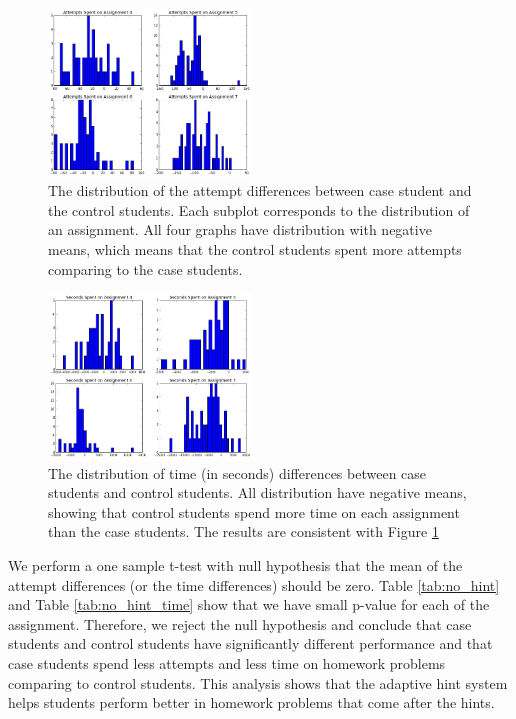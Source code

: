 \documentclass{sigchi}
\begin{document}
\begin{figure}[ht]
\includegraphics[width=0.48\textwidth]{image/assignment_tries_downstream.png}
\caption{The distribution of the attempt differences between case student and the control students. Each subplot corresponds to the distribution of an assignment. All four graphs have distribution with negative means, which means that the control students spent more attempts comparing to the case students.}
    \label{fig:downstream_tries_analysis}
\end{figure}

\begin{figure}[ht]
\includegraphics[width=0.48\textwidth]{image/assignment_time_downstream.png}
\caption{The distribution of time (in seconds) differences between case students and control students. All distribution have negative means, showing that control students spend more time on each assignment than the case students. The results are consistent with Figure \ref{fig:downstream_tries_analysis}}
    \label{fig:downstream_time_analysis}
\end{figure}

We perform a one sample t-test with null hypothesis that the mean of the attempt differences (or the time differences) should be zero. Table \ref{tab:no_hint} and Table \ref{tab:no_hint_time} show that we have small p-value for each of the assignment. Therefore, we reject the null hypothesis and conclude that case students and control students have significantly different performance and that case students spend less attempts and less time on homework problems comparing to control students. This analysis shows that the adaptive hint system helps students perform better in homework problems that come after the hints. 
\end{document}
